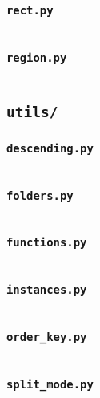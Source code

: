 \subsubsection{\texttt{rect.py}}\label{subsubsec:rect.py}
\inputminted{py}{src/model/rect.py}

\subsubsection{\texttt{region.py}}\label{subsubsec:region.py}
\inputminted{py}{src/model/region.py}

\subsection{\texttt{utils/}}\label{subsec:utils/}

\subsubsection{\texttt{descending.py}}\label{subsubsec:descending.py}
\inputminted{py}{src/utils/descending.py}

\subsubsection{\texttt{folders.py}}\label{subsubsec:folders.py}
\inputminted{py}{src/utils/folders.py}

\subsubsection{\texttt{functions.py}}\label{subsubsec:functions.py}
\inputminted{py}{src/utils/functions.py}

\subsubsection{\texttt{instances.py}}\label{subsubsec:instances.py}
\inputminted{py}{src/utils/instances.py}

\subsubsection{\texttt{order\_key.py}}\label{subsubsec:order_key.py}
\inputminted{py}{src/utils/order_key.py}

\subsubsection{\texttt{split\_mode.py}}\label{subsubsec:split_mode.py}
\inputminted{py}{src/utils/split_mode.py}
